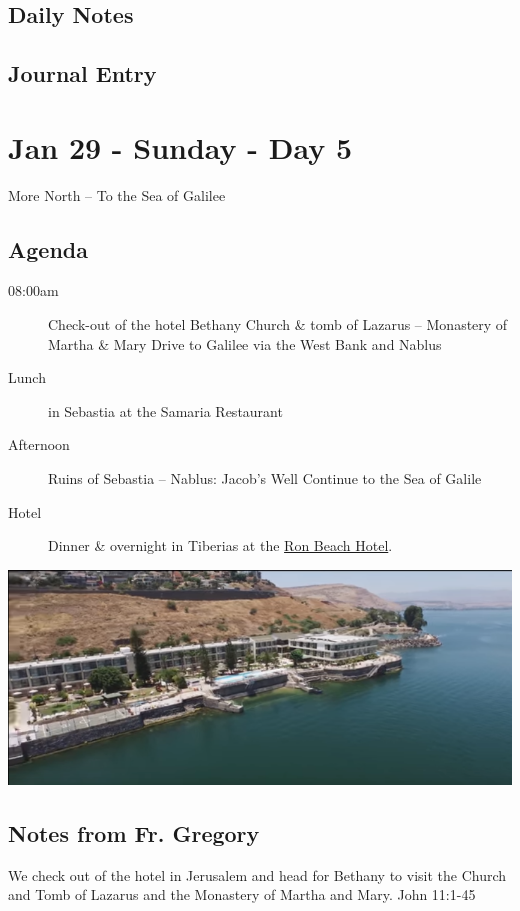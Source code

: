 \documentclass[letterpaper]{report}
\begin{document}
\subsection{Daily Notes}

\clearpage
\subsection{Journal Entry}

\clearpage
\section{Jan 29 - Sunday - Day 5}
More North -- To the Sea of Galilee
\subsection{Agenda}
\begin{description}
	\item[08:00am] Check-out of the hotel Bethany
	  \subitem Church \& tomb of Lazarus – Monastery of Martha \& Mary
	  \subitem Drive to Galilee via the West Bank and Nablus
	\item[Lunch] in Sebastia at the Samaria Restaurant
	\item[Afternoon] Ruins of Sebastia – Nablus: Jacob’s Well
	  \subitem Continue to the Sea of Galile
	\item[Hotel] Dinner \& overnight in Tiberias at the
	  \href{http://www.ronbeachhotel.com/}{Ron Beach Hotel}.
\end{description}

\includegraphics[width=\textwidth]{RonBeachHotel}

\subsection{Notes from Fr. Gregory}
We check out of the hotel in Jerusalem and head for Bethany to visit the 
Church and Tomb of Lazarus and the Monastery of Martha and Mary.
John 11:1-45
\end{document}
